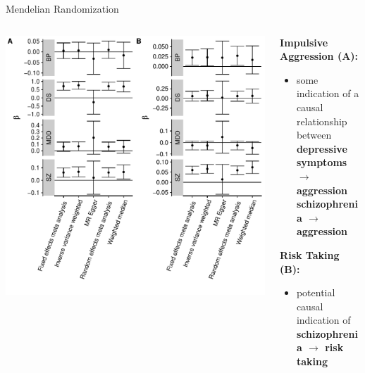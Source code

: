 \documentclass{beamer}
\begin{document}
\begin{frame}[t]{Mendelian Randomization}
  \tiny
  \begin{columns}[T]
    \begin{column}[T]{0.6\textwidth}
      \centering
      \includegraphics[width=0.99\linewidth]{../ukb_psychiatric/figures/overall_mr_effect.pdf}
    \end{column}
    \begin{column}[T]{0.5\textwidth}

      \textbf{Impulsive Aggression (A):}\\
      \begin{itemize}
        \item some indication of a causal relationship between\\
          \textbf{depressive symptoms $\rightarrow$ aggression }  \\
        \textbf{schizophrenia $\rightarrow$ aggression}
      \end{itemize}

      \textbf{Risk Taking (B):}\\
      \begin{itemize}
        \item potential causal indication of \\ \textbf{schizophrenia $\rightarrow$ risk taking} 
      \end{itemize}


\end{column}
\end{columns}
\end{frame}
\end{document}
